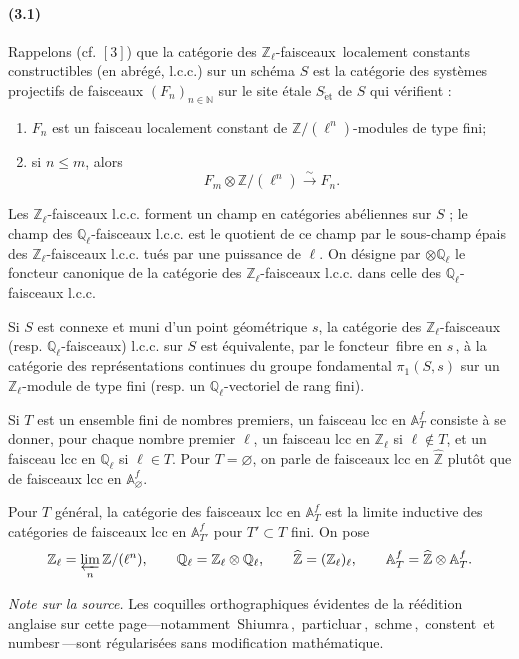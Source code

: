 \documentclass[10pt]{article}
\newcommand{\Q}{\mathbb Q}
\newcommand{\Z}{\mathbb Z}
\newcommand{\bZ}{\widehat{\mathbb Z}}
\newcommand{\et}{\mathrm{\acute et}}
\newcommand{\frquote}[1]{\guillemotleft{}\,#1\,\guillemotright{}}
\begin{document}
\paragraph{(3.1)}
Rappelons (cf. \([3]\)) que la catégorie des $\Z_\ell$-faisceaux \frquote{localement
constants} constructibles (en abrégé, l.c.c.) sur un schéma $S$ est la catégorie des
systèmes projectifs de faisceaux $(F_n)_{n\in\mathbb N}$ sur le site étale $S_{\et}$ de $S$
qui vérifient :
\begin{enumerate}[label=(\roman*)]
\item $F_n$ est un faisceau localement constant de $\Z/(\ell^n)$-modules de type fini;
\item si $n\le m$, alors
\[
F_m\otimes\Z/(\ell^n)\xrightarrow{\sim}F_n.
\]
\end{enumerate}
Les $\Z_\ell$-faisceaux l.c.c. forment un champ en catégories abéliennes sur $S$ ; le
champ des $\Q_\ell$-faisceaux l.c.c. est le quotient de ce champ par le sous-champ épais
des $\Z_\ell$-faisceaux l.c.c. tués par une puissance de $\ell$. On désigne par
$\otimes\Q_\ell$ le foncteur canonique de la catégorie des $\Z_\ell$-faisceaux l.c.c. dans
celle des $\Q_\ell$-faisceaux l.c.c.

Si $S$ est connexe et muni d'un point géométrique $s$, la catégorie des $\Z_\ell$-faisceaux
(resp. $\Q_\ell$-faisceaux) l.c.c. sur $S$ est équivalente, par le foncteur \frquote{fibre en
$s$}, à la catégorie des représentations continues du groupe fondamental $\pi_1(S,s)$ sur
un $\Z_\ell$-module de type fini (resp. un $\Q_\ell$-vectoriel de rang fini).

Si $T$ est un ensemble fini de nombres premiers, un faisceau lcc en $\mathbb A_T^f$ consiste à se
donner, pour chaque nombre premier $\ell$, un faisceau lcc en $\Z_\ell$ si $\ell\notin T$,
et un faisceau lcc en $\Q_\ell$ si $\ell\in T$. Pour $T=\varnothing$, on parle de faisceaux
lcc en $\bZ$ plutôt que de faisceaux lcc en $\mathbb A_\varnothing^f$.

Pour $T$ général, la catégorie des faisceaux lcc en $\mathbb A_T^f$ est la limite inductive des
catégories de faisceaux lcc en $\mathbb A_{T'}^f$ pour $T'\subset T$ fini. On pose
\[
\Z_\ell=\varprojlim_n \Z/(\ell^n),\qquad
\Q_\ell=\Z_\ell\otimes\Q_\ell,\qquad
\bZ=(\Z_\ell)_\ell,\qquad
\mathbb A_T^f=\bZ\otimes\mathbb A_T^f.
\]

\noindent\emph{Note sur la source.} Les coquilles orthographiques évidentes de la réédition
anglaise sur cette page---notamment \frquote{Shiumra}, \frquote{particluar}, \frquote{schme},
\frquote{constent} et \frquote{numbesr}---sont régularisées sans modification mathématique.
\end{document}
